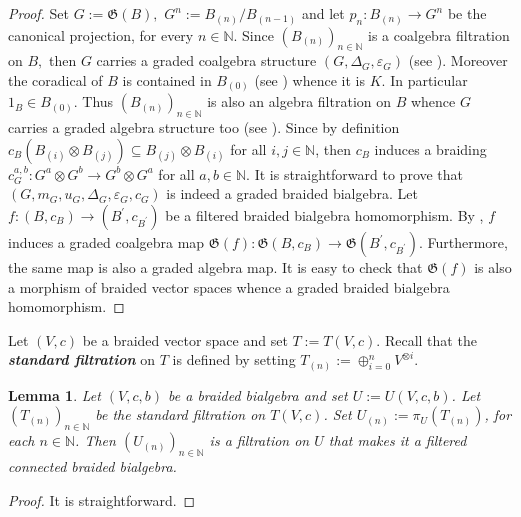 \documentclass[english]{amsart}
\numberwithin{equation}{section}
\numberwithin{figure}{section}
\theoremstyle{plain}
\theoremstyle{definition}
\theoremstyle{definition}
\theoremstyle{remark}
\theoremstyle{remark}
\theoremstyle{plain}
\newtheorem{lem}[thm]{Lemma}
\theoremstyle{plain}
\theoremstyle{plain}
\begin{document}
\begin{proof}
Set $G:=\mathfrak{G}\left(B\right),$ $G^{n}:=B_{\left(n\right)}/B_{\left(n-1\right)}$
and let $p_{n}:B_{\left(n\right)}\rightarrow G^{n}$ be the canonical
projection, for every $n\in\mathbb{N}$. Since $\left(B_{\left(n\right)}\right)_{n\in\mathbb{N}}$
is a coalgebra filtration on $B,$ then $G$ carries a graded coalgebra
structure $\left(G,\Delta_{G},\varepsilon_{G}\right)$ (see \cite[page 230]{Sw}).
Moreover the coradical of $B$ is contained in $B_{\left(0\right)}$
(see \cite[Proposition 11.1.1]{Sw}) whence it is $K.$ In particular
$1_{B}\in B_{\left(0\right)}$. Thus $\left(B_{\left(n\right)}\right)_{n\in\mathbb{N}}$
is also an algebra filtration on $B$ whence $G$ carries a graded
algebra structure too (see \cite[page 230]{Sw}). Since by definition
$c_{B}\left(B_{\left(i\right)}\otimes B_{\left(j\right)}\right)\subseteq B_{\left(j\right)}\otimes B_{\left(i\right)}$
for all $i,j\in\mathbb{N}$, then $c_{B}$ induces a braiding $c_{G}^{a,b}:G^{a}\otimes G^{b}\rightarrow G^{b}\otimes G^{a}$
for all $a,b\in\mathbb{N}.$ It is straightforward to prove that $\left(G,m_{G},u_{G},\Delta_{G},\varepsilon_{G},c_{G}\right)$
is indeed a graded braided bialgebra. Let $f:\left(B,c_{B}\right)\rightarrow\left(B^{\prime},c_{B^{\prime}}\right)$
be a filtered braided bialgebra homomorphism. By \cite[page 229]{Sw},
$f$ induces a graded coalgebra map $\mathfrak{G}\left(f\right):\mathfrak{G}\left(B,c_{B}\right)\rightarrow\mathfrak{G}\left(B^{\prime},c_{B^{\prime}}\right)$.
Furthermore, the same map is also a graded algebra map. It is easy
to check that $\mathfrak{G}\left(f\right)$ is also a morphism of
braided vector spaces whence a graded braided bialgebra homomorphism. 
\end{proof}
Let $\left(V,c\right)$ be a braided vector space and set $T:=T\left(V,c\right)$.
Recall that the \textbf{\emph{standard filtration}} on $T$ is defined
by setting $T_{\left(n\right)}:=\oplus_{i=0}^{n}V^{\otimes i}.$ 
\begin{lem}
\label{lem: induced filtration}Let $\left(V,c,b\right)$ be a braided
bialgebra and set $U:=U(V,c,b)$. Let $\left(T_{\left(n\right)}\right)_{n\in\mathbb{N}}$
be the standard filtration on $T\left(V,c\right)$. Set $U_{\left(n\right)}:=\pi_{U}\left(T_{\left(n\right)}\right)$,
for each $n\in\mathbb{N}$. Then $\left(U_{\left(n\right)}\right)_{n\in\mathbb{N}}$
is a filtration on $U$ that makes it a filtered connected braided
bialgebra. \end{lem}
\begin{proof}
It is straightforward.\end{proof}
\end{document}

